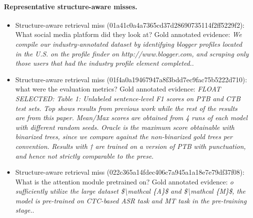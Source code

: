 \paragraph{Representative structure-aware misses.}
\begin{itemize}
\item Structure-aware retrieval miss (01a41c0a4a7365cd37d28690735114f2ff5229f2): What social media platform did they look at? Gold annotated evidence: \emph{We compile our industry-annotated dataset by identifying blogger profiles located in the U.S. on the profile finder on http://www.blogger.com, and scraping only those users that had the industry profile element completed.}.
\item Structure-aware retrieval miss (01f4a0a19467947a8f3bdd7ec9fac75b5222d710): what were the evaluation metrics? Gold annotated evidence: \emph{FLOAT SELECTED: Table 1: Unlabeled sentence-level F1 scores on PTB and CTB test sets. Top shows results from previous work while the rest of the results are from this paper. Mean/Max scores are obtained from 4 runs of each model with different random seeds. Oracle is the maximum score obtainable with binarized trees, since we compare against the non-binarized gold trees per convention. Results with † are trained on a version of PTB with punctuation, and hence not strictly comparable to the prese}.
\item Structure-aware retrieval miss (022c365a14fdec406c7a945a1a18e7e79df37f08): What is the attention module pretrained on? Gold annotated evidence: \emph{o sufficiently utilize the large dataset \$\textbackslash{}mathcal \{A\}\$ and \$\textbackslash{}mathcal \{M\}\$, the model is pre-trained on CTC-based ASR task and MT task in the pre-training stage.}.
\end{itemize}
